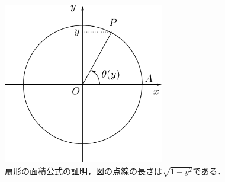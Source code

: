 \documentclass[11pt,a4paper]{ltjsarticle}
\theoremstyle{definition}
\begin{document}
\begin{figure}[htbp]
  \centering
  \includegraphics[width=70mm]{fig/sector.pdf}
  \caption{扇形の面積公式の証明，図の点線の長さは$\sqrt{1 - y^2}$である．}
  \label{fig:sector}
\end{figure}
\end{document}
